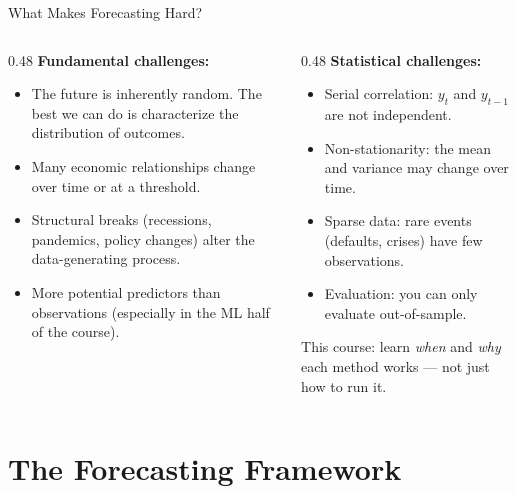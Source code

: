 \documentclass[aspectratio=169, 11pt]{beamer}
\begin{document}
\begin{frame}{What Makes Forecasting Hard?}
  \begin{columns}[T]
    \begin{column}{0.48\textwidth}
      \textbf{Fundamental challenges:}
      \begin{itemize}
        \item {} The future is inherently random.
              The best we can do is characterize the distribution of outcomes.
        \item {} Many economic relationships change
              over time or at a threshold.
        \item {} Structural breaks (recessions, pandemics,
              policy changes) alter the data-generating process.
        \item {} More potential predictors than
              observations (especially in the ML half of the course).
      \end{itemize}
    \end{column}
    \begin{column}{0.48\textwidth}
      \textbf{Statistical challenges:}
      \begin{itemize}
        \item Serial correlation: $y_t$ and $y_{t-1}$ are not independent.
        \item Non-stationarity: the mean and variance may change over time.
        \item Sparse data: rare events (defaults, crises) have few observations.
        \item Evaluation: you can only evaluate out-of-sample.
      \end{itemize}
      \vspace{0.3cm}
      \begin{keybox}
        This course: learn \emph{when} and \emph{why} each method works ---
        not just how to run it.
      \end{keybox}
    \end{column}
  \end{columns}
\end{frame}

\section{The Forecasting Framework}
\end{document}
